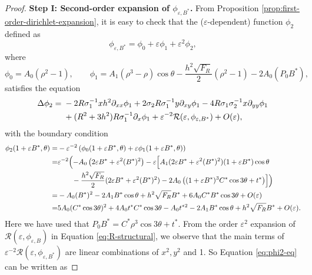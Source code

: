 \documentclass[12pt,reqno]{amsart}
\numberwithin{equation}{section}
\theoremstyle{definition}
\theoremstyle{remark}
\begin{document}
\begin{proof}
\textbf{Step I: Second-order expansion of $ \phi_{\varepsilon,B^*} $.}
From Proposition \ref{prop:first-order-dirichlet-expansion}, it is easy to check that the ($\varepsilon$-dependent) function $ \phi_2 $ defined  as
\begin{equation}\label{eq:phi2-decomp}
\phi_{\varepsilon,B^*}=\phi_0+\varepsilon\phi_1+\varepsilon^2\phi_2,
\end{equation}
where
\begin{equation*}%
\phi_0=A_0(\rho^2-1),
\qquad
\phi_1=A_1(\rho^3-\rho)\cos\theta-\frac{h^2\sqrt{F_R}}{2}(\rho^2-1)-2A_0(P_0B^*),
\end{equation*}
satisfies the equation
\begin{align}\label{eq:phi2-eq}
\Delta\phi_2={}&-2R\sigma_1^{-1}xh^2\partial_{xx}\phi_1
+2\sigma_2R\sigma_1^{-1}y\partial_{xy}\phi_1
-4R\sigma_1\sigma_2^{-1}x\partial_{yy}\phi_1\notag\\
& +(R^2+3h^2)R\sigma_1^{-1}\partial_x\phi_1+\varepsilon^{-2}\mathcal{R}(\varepsilon,\phi_{\varepsilon,B^*})+O(\varepsilon),
\end{align}
with the boundary condition
\begin{equation*}%
\begin{split}
\phi_2(1+\varepsilon B^*,\theta)=&-\varepsilon^{-2}\left( \phi_0(1+\varepsilon B^*,\theta)+\varepsilon\phi_1(1+\varepsilon B^*,\theta)\right) \\
=& \varepsilon^{-2}\Bigl(-A_0\left (2\varepsilon B^*+\varepsilon^2(B^*)^2\right )-\varepsilon\Bigl[A_1(2\varepsilon B^*+\varepsilon^2(B^*)^2)(1+\varepsilon B^*)\cos\theta\\
&\ \ \ \ \ \ -\frac{h^2\sqrt{F_R}}{2}(2\varepsilon B^*+\varepsilon^2(B^*)^2)-2A_0\left( (1+\varepsilon B^*)^3C^*\cos3\theta+t^* \right) \Bigr] \Bigr)\\
=&-A_0(B^*)^2-2A_1B^*\cos\theta+h^2\sqrt{F_R}B^*+6A_0C^*B^*\cos3\theta+O(\varepsilon)\\
=&5A_0 (C^*\cos3\theta)^2 +4A_0t^* C^*\cos3\theta    -A_0t^{*2}-2A_1 B^*\cos\theta  +h^2\sqrt{F_R}  B^*+O(\varepsilon).
\end{split}
\end{equation*}
Here we have used that $ P_0B^* =C^*\rho^3\cos3\theta+t^*. $ From the order $ \varepsilon^2 $ expansion of $ \mathcal{R}(\varepsilon,\phi_{\varepsilon,B}) $ in Equation \eqref{eq:R-structural}, we observe that the main terms of $ \varepsilon^{-2}\mathcal{R}(\varepsilon,\phi_{\varepsilon,B^*}) $ are linear combinations of $ x^2,y^2 $ and 1. So Equation \eqref{eq:phi2-eq} can be written as

\end{proof}
\end{document}
